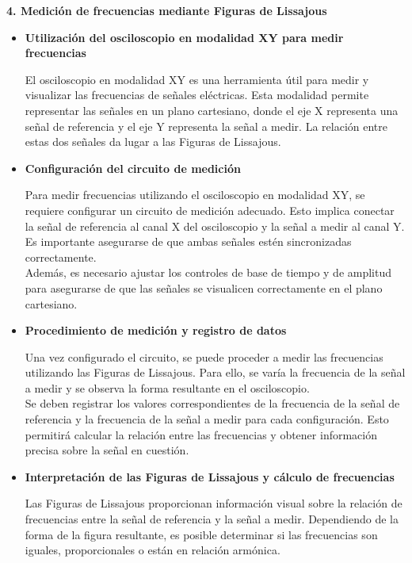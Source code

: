 \documentclass[12pt]{article}
\begin{document}
	\textbf{4. Medición de frecuencias mediante Figuras de Lissajous}\\
	
	\begin{itemize}
		\item \textbf{Utilización del osciloscopio en modalidad XY para medir frecuencias}
		
		El osciloscopio en modalidad XY es una herramienta útil para medir y visualizar las frecuencias de señales eléctricas. Esta modalidad permite representar las señales en un plano cartesiano, donde el eje X representa una señal de referencia y el eje Y representa la señal a medir. La relación entre estas dos señales da lugar a las Figuras de Lissajous.
		
		\item \textbf{Configuración del circuito de medición}
		
		Para medir frecuencias utilizando el osciloscopio en modalidad XY, se requiere configurar un circuito de medición adecuado. Esto implica conectar la señal de referencia al canal X del osciloscopio y la señal a medir al canal Y. Es importante asegurarse de que ambas señales estén sincronizadas correctamente.\\
		
		Además, es necesario ajustar los controles de base de tiempo y de amplitud para asegurarse de que las señales se visualicen correctamente en el plano cartesiano.
		
		\item \textbf{Procedimiento de medición y registro de datos}
		
		Una vez configurado el circuito, se puede proceder a medir las frecuencias utilizando las Figuras de Lissajous. Para ello, se varía la frecuencia de la señal a medir y se observa la forma resultante en el osciloscopio.\\
		
		Se deben registrar los valores correspondientes de la frecuencia de la señal de referencia y la frecuencia de la señal a medir para cada configuración. Esto permitirá calcular la relación entre las frecuencias y obtener información precisa sobre la señal en cuestión.
		
		\item \textbf{Interpretación de las Figuras de Lissajous y cálculo de frecuencias}
		
		Las Figuras de Lissajous proporcionan información visual sobre la relación de frecuencias entre la señal de referencia y la señal a medir. Dependiendo de la forma de la figura resultante, es posible determinar si las frecuencias son iguales, proporcionales o están en relación armónica.
		

\end{itemize}
\end{document}
